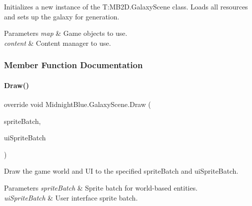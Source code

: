 Initializes a new instance of the T\+:\+M\+B2\+D.\+Galaxy\+Scene class. Loads all resources and sets up the galaxy for generation. 


\begin{DoxyParams}{Parameters}
{\em map} & Game objects to use.\\
\hline
{\em content} & Content manager to use.\\
\hline
\end{DoxyParams}


\subsubsection{Member Function Documentation}
\hypertarget{class_midnight_blue_1_1_galaxy_scene_a3646fcf97e067bac267d42aad66e71c4}{}\label{class_midnight_blue_1_1_galaxy_scene_a3646fcf97e067bac267d42aad66e71c4} 
\paragraph{\texorpdfstring{Draw()}{Draw()}}
{\footnotesize\ttfamily override void Midnight\+Blue.\+Galaxy\+Scene.\+Draw (\begin{DoxyParamCaption}\item[{Sprite\+Batch}]{sprite\+Batch,  }\item[{Sprite\+Batch}]{ui\+Sprite\+Batch }\end{DoxyParamCaption})\hspace{0.3cm}{\ttfamily [inline]}}



Draw the game world and UI to the specified sprite\+Batch and ui\+Sprite\+Batch. 


\begin{DoxyParams}{Parameters}
{\em sprite\+Batch} & Sprite batch for world-\/based entities.\\
\hline
{\em ui\+Sprite\+Batch} & User interface sprite batch.\\
\hline
\end{DoxyParams}
\hypertarget{class_midnight_blue_1_1_galaxy_scene_a7a96978e050da997330bcc0f3cd00f9e}{}\label{class_midnight_blue_1_1_galaxy_scene_a7a96978e050da997330bcc0f3cd00f9e} 
